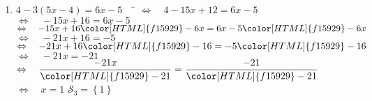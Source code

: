 \documentclass[a4paper,11pt,exos]{nsi} %
\begin{document}
\begin{enumerate}
	
    \item 	\begin{tabbing}
        $ 4-3(5x-4)=6x-5 \quad$	\=	$\Leftrightarrow\quad 4-15x+12=6x-5 $\\
        \>	$\Leftrightarrow\quad   -15x+16=6x-5 $\\
        \>	$\Leftrightarrow\quad   -15x+16{\color[HTML]{f15929}-6x}=6x-5{\color[HTML]{f15929}-6x} $\\
        \>	$\Leftrightarrow\quad	-21x+16=-5 $\\
        \>	$\Leftrightarrow\quad   -21x+16{\color[HTML]{f15929}-16}=-5{\color[HTML]{f15929}-16} $\\
        \>	$\Leftrightarrow\quad	-21x=-21 $\\
        \>	$\Leftrightarrow\quad	\dfrac{-21x}{\color[HTML]{f15929}-21}=\dfrac{-21}{\color[HTML]{f15929}-21} $\\
        \>	$\Leftrightarrow\quad	x=1$ \hspace{4cm} $\mathcal{S}_3=\left\{ 1 \right\}$
    \end{tabbing}
\end{enumerate}
\end{document}
